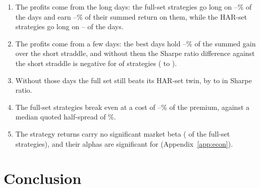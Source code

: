 \begin{enumerate}
  \rhemYearsFullMedAboveHarMedWord{} of \rhemNYearsWord{} years, and the \rhmcsNAltWord{} full-set ratios are positive in
  \rhemYearsFullAllPosWord{} of \rhemNYearsWord{} years (Figure~\ref{fig:rh_econ_byyear}).
\item The profits come from the long days: the full-set strategies go long on \rhedLongPctMin--\rhedLongPctMax\% of
  the days and earn \rhedLongShareMin--\rhedLongShareMax\% of their summed return on them, while the HAR-set strategies
  go long on \rhedHarLongNMin--\rhedHarLongNMax{} of the \rhedNDays{} days.
\item The profits come from a few days: the \rhedNTop{} best days hold \rhedBestShareMin--\rhedBestShareMax\% of the
  summed gain over the short straddle, and without them the Sharpe ratio difference against the short straddle is
  negative for \rhedDShortExBestNeg{} of \rhmcsNAlt{} strategies (\rhedDShortExBestMin{} to \rhedDShortExBestMax).
\item Without those days the full set still beats its HAR-set twin, by \rhedDHarExBestMin{} to \rhedDHarExBestMax{}
  in Sharpe ratio.
\item The full-set strategies break even at a cost of \rhemBeMeanFullMinPct--\rhemBeMeanFullMaxPct\% of the premium,
  against a median quoted half-spread of \rhemHalfSpreadMed\%.
\item The strategy returns carry no significant market beta (\rhebBetaSigFullWord{} of the full-set strategies), and
  their alphas are significant for \rhebAlphaSigFullWord{} (Appendix~\ref{app:econ}).
\end{enumerate}





\section{Conclusion}
\label{sec:concl}

